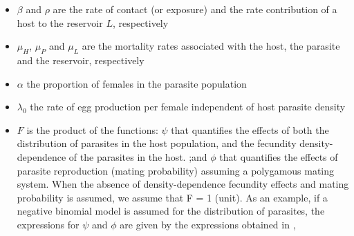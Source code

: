 \documentclass[12pt,a4paper]{article}
\theoremstyle{plain}%
\theoremstyle{definition}
\theoremstyle{remark}
\begin{document}
	\begin{itemize}
		\item %
		$\beta$ and $\rho$ are the rate of contact (or exposure) and the rate contribution of a host to the reservoir $L$, respectively
		\item $\mu_H$, $\mu_P$ and $\mu_L$ 
		are the mortality rates associated with the host, the parasite and the reservoir, respectively
		\item $\alpha$ %
		the proportion of females in the parasite population
		\item $\lambda_0$ %
		the rate of egg production per female independent of host parasite density
		\item $F$ %
		is the product of the functions: 
		$\psi$ that quantifies the effects of both the distribution of parasites in the host population, and the fecundity density-dependence of the parasites in the host.
		;and $\phi$ that quantifies the effects of parasite reproduction (mating probability) assuming a polygamous mating system. 
		When the absence of density-dependence fecundity effects and mating probability is assumed, we assume that F = 1 (unit). As an example, if a negative binomial model is assumed for the distribution of parasites, the expressions for $\psi$ and $\phi$ are given by the expressions obtained in \citet{lopez2022general},
		
		

\end{itemize}
\end{document}
